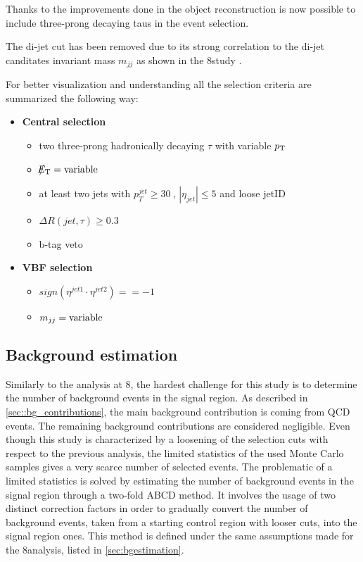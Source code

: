 Thanks to the improvements done in the \hadtau object reconstruction is now possible to include three-prong decaying taus in the event selection.

The di-jet \deltaeta cut has been removed due to its strong correlation to the di-jet canditates invariant mass $m_{jj}$ as shown in the 8\tev study \cite{Khachatryan:2015kxa}.

For better visualization and understanding all the selection criteria are summarized the following way:

\begin{itemize}
	\item \textbf{Central selection}
	\begin{itemize}
		\item two three-prong hadronically decaying $\tau$ with variable $p_{\text{T}}$
		\item $\slash\mkern-12mu{E}_{\text{T}} = \text{variable}$
		\item at least two jets with $p_{T}^{jet}\geq30~$\gev, $|\eta_{jet}|\leq5$ and loose jetID
		\item $\Delta R(jet,\tau)\geq0.3$
		\item b-tag veto
	\end{itemize}
	\item \textbf{VBF selection}
	\begin{itemize}
		\item $sign(\eta^{jet 1}\cdot\eta^{jet 2})==-1$
		\item $m_{jj} = \text{variable}$
	\end{itemize}
\end{itemize}

\subsection{Background estimation}


Similarly to the analysis at 8\tev, the hardest challenge for this study is to determine the number of background events in the signal region. As described in \autoref{sec::bg_contributions}, the main background contribution is coming from QCD events. The remaining background contributions are considered negligible. Even though this study is characterized by a loosening of the selection cuts with respect to the previous analysis, the limited statistics of the used Monte Carlo samples gives a very scarce number of selected events. The problematic of a limited statistics is solved by estimating the number of background events in the signal region through a two-fold ABCD method. It involves the usage of two distinct correction factors in order to gradually convert the number of background events, taken from a starting control region with looser cuts, into the signal region ones. This method is defined under the same assumptions made for the 8\tev analysis, listed in \autoref{sec:bgestimation}.


